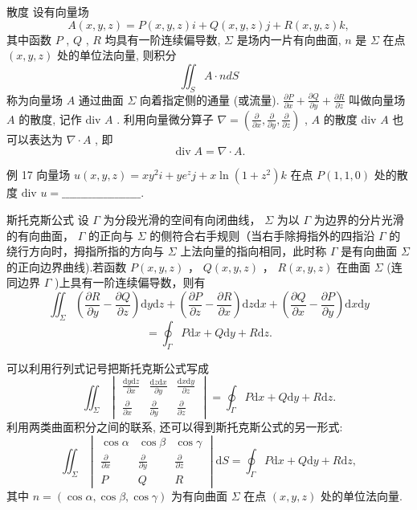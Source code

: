 散度
设有向量场
\[A(x,y,z) = P(x,y,z)i + Q(x,y,z)j + R(x,y,z)k,\]
其中函数 \(P\) , \(Q\) , \(R\) 均具有一阶连续偏导数, \(\Sigma\) 是场内一片有向曲面, \(n\) 是 \(\Sigma\) 在点 \((x,y,z)\) 处的单位法向量, 则积分
\[\iint_{S}A\cdot ndS\]
称为向量场 \(A\) 通过曲面 \(\Sigma\) 向着指定侧的通量 (或流量).
\(\frac{\partial P}{\partial x} +\frac{\partial Q}{\partial y} +\frac{\partial R}{\partial z}\) 叫做向量场 \(A\) 的散度, 记作 div \(A\) . 利用向量微分算子 \(\nabla = \left(\frac{\partial}{\partial x}, \frac{\partial}{\partial y}, \frac{\partial}{\partial z}\right)\) , \(A\) 的散度 div \(A\) 也可以表达为 \(\nabla \cdot A\) , 即
\[\operatorname {div} A = \nabla \cdot A.\]

例 17 向量场 \(u(x, y, z) = xy^2i + ye^z j + x \ln(1 + z^2)k\) 在点 \(P(1, 1, 0)\) 处的散度 \(\text{div } u = \_\_\_\_\_\_\_\_\_\_\_\_\_\_\_\_\_\_\_\_\_\).

斯托克斯公式
设 \(\Gamma\) 为分段光滑的空间有向闭曲线， \(\Sigma\) 为以 \(\Gamma\) 为边界的分片光滑的有向曲面， \(\Gamma\) 的正向与 \(\Sigma\) 的侧符合右手规则（当右手除拇指外的四指沿 \(\Gamma\) 的绕行方向时，拇指所指的方向与 \(\Sigma\) 上法向量的指向相同，此时称 \(\Gamma\) 是有向曲面 \(\Sigma\) 的正向边界曲线).若函数 \(P(x,y,z)\) ， \(Q(x,y,z)\) ， \(R(x,y,z)\) 在曲面 \(\Sigma\) (连同边界 \(\Gamma\) )上具有一阶连续偏导数，则有
\[\iint_{\Sigma}\left(\frac{\partial R}{\partial y} -\frac{\partial Q}{\partial z}\right)\mathrm{d}y\mathrm{d}z + \left(\frac{\partial P}{\partial z} -\frac{\partial R}{\partial x}\right)\mathrm{d}z\mathrm{d}x + \left(\frac{\partial Q}{\partial x} -\frac{\partial P}{\partial y}\right)\mathrm{d}x\mathrm{d}y\] \[= \oint_{\Gamma}P\mathrm{d}x + Q\mathrm{d}y + R\mathrm{d}z.\]

可以利用行列式记号把斯托克斯公式写成
\[ \iint_{\Sigma} \begin{vmatrix} \frac{\mathrm{d}y\mathrm{d}z}{\partial x} & \frac{\mathrm{d}z\mathrm{d}x}{\partial y} & \frac{\mathrm{d}x\mathrm{d}y}{\partial z} \\ \frac{\partial}{\partial x} & \frac{\partial}{\partial y} & \frac{\partial}{\partial z} \end{vmatrix} = \oint_{\Gamma} P\mathrm{d}x + Q\mathrm{d}y + R\mathrm{d}z. \]
利用两类曲面积分之间的联系, 还可以得到斯托克斯公式的另一形式:
\[ \iint_{\Sigma} \begin{vmatrix} \cos\alpha & \cos\beta & \cos\gamma \\ \frac{\partial}{\partial x} & \frac{\partial}{\partial y} & \frac{\partial}{\partial z} \\ P & Q & R \end{vmatrix} \mathrm{d}S = \oint_{\Gamma} P\mathrm{d}x + Q\mathrm{d}y + R\mathrm{d}z, \]
其中 \(n = (\cos\alpha, \cos\beta, \cos\gamma)\) 为有向曲面 \(\Sigma\) 在点 \((x, y, z)\) 处的单位法向量.

